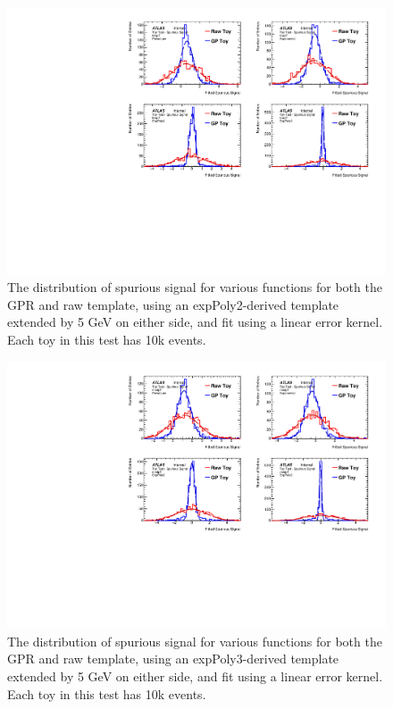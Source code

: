 \begin{figure} 
\begin{center}
  \includegraphics[width=\textwidth]{figures/background/gpr/validation/linear/ToyTest_FitSigVals_lowpT_10k_noSig}   
\caption{The distribution of spurious signal for various functions for both the GPR and raw template, using an expPoly2-derived template extended by 5 GeV on either side, and fit using a linear error kernel. Each toy in this test has 10k events.}
\label{fig:linearkernel_lowpt_10k_noSig}
\end{center}
\end{figure}

\begin{figure} 
\begin{center}
  \includegraphics[width=\textwidth]{figures/background/gpr/validation/linear/ToyTest_FitSigVals_medpT_10k_noSig}   
\caption{The distribution of spurious signal for various functions for both the GPR and raw template, using an expPoly3-derived template extended by 5 GeV on either side, and fit using a linear error kernel. Each toy in this test has 10k events.}
\label{fig:linearkernel_medpt_10k_noSig}
\end{center}
\end{figure}

